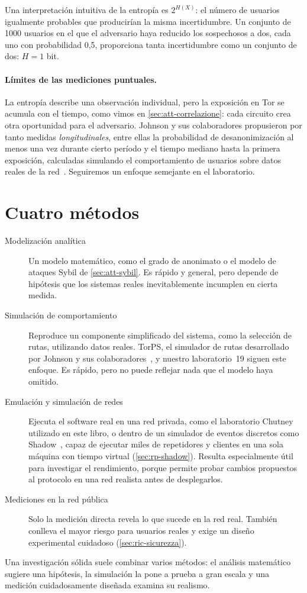Una interpretación intuitiva de la entropía es $2^{H(X)}$: el número de usuarios igualmente probables que producirían la misma incertidumbre. Un conjunto de \num{1000} usuarios en el que el adversario haya reducido los sospechosos a dos, cada uno con probabilidad 0,5, proporciona tanta incertidumbre como un conjunto de dos: $H = 1$ bit.

\paragraph{Límites de las mediciones puntuales.} La entropía describe una observación individual, pero la exposición en Tor se acumula con el tiempo, como vimos en \cref{sec:att-correlazione}: cada circuito crea otra oportunidad para el adversario. Johnson y sus colaboradores propusieron por tanto medidas \emph{longitudinales}, entre ellas la probabilidad de desanonimización al menos una vez durante cierto período y el tiempo mediano hasta la primera exposición, calculadas simulando el comportamiento de usuarios sobre datos reales de la red~\cite{johnson2013users}. Seguiremos un enfoque semejante en el laboratorio.

\section{Cuatro métodos}\label{sec:ric-metodi}

\begin{description}
  \item[Modelización analítica] Un modelo matemático, como el grado de anonimato o el modelo de ataques Sybil de \cref{sec:att-sybil}. Es rápido y general, pero depende de hipótesis que los sistemas reales inevitablemente incumplen en cierta medida.
  \item[Simulación de comportamiento] Reproduce un componente simplificado del sistema, como la selección de rutas, utilizando datos reales. TorPS, el simulador de rutas desarrollado por Johnson y sus colaboradores~\cite{johnson2013users}, y nuestro laboratorio~19 siguen este enfoque. Es rápido, pero no puede reflejar nada que el modelo haya omitido.
  \item[Emulación y simulación de redes] Ejecuta el software real en una red privada, como el laboratorio Chutney utilizado en este libro, o dentro de un simulador de eventos discretos como Shadow~\cite{jansen2012shadow}, capaz de ejecutar miles de repetidores y clientes en una sola máquina con tiempo virtual (\cref{sec:rp-shadow}). Resulta especialmente útil para investigar el rendimiento, porque permite probar cambios propuestos al protocolo en una red realista antes de desplegarlos.
  \item[Mediciones en la red pública] Solo la medición directa revela lo que sucede en la red real. También conlleva el mayor riesgo para usuarios reales y exige un diseño experimental cuidadoso (\cref{sec:ric-sicurezza}).
\end{description}
Una investigación sólida suele combinar varios métodos: el análisis matemático sugiere una hipótesis, la simulación la pone a prueba a gran escala y una medición cuidadosamente diseñada examina su realismo.

